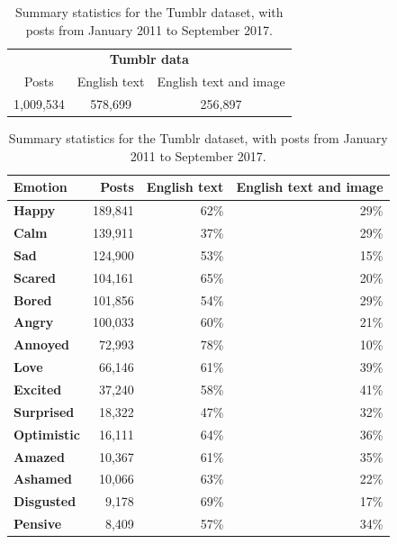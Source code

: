 \documentclass{article} %
\begin{document}
\begin{table}[H]
\caption{Summary statistics for the Tumblr dataset, with posts from January 2011 to September 2017.}
\begin{center}
    \begin{tabular}{ccc}
    \multicolumn{3}{c}{{\large \textbf{Tumblr data}}} \\
    \addlinespace[0.2cm]
    \toprule
    Posts & English text & English text and image \\
    \midrule
    1,009,534 & 578,699 & 256,897 \\
    \bottomrule
    \end{tabular}
	
    \vspace{0.2cm}
    
    \begin{tabular}{lrrr}
    \toprule
    Emotion & Posts & English text & English text and image\\
    \midrule
\textbf{Happy} & 189,841 & 62\% & 29\% \\
\textbf{Calm} & 139,911 & 37\% & 29\% \\
\textbf{Sad} & 124,900 & 53\% & 15\% \\
\textbf{Scared} & 104,161 & 65\% & 20\% \\
\textbf{Bored} & 101,856 & 54\% & 29\% \\
\textbf{Angry} & 100,033 & 60\% & 21\% \\
\textbf{Annoyed} & 72,993 & 78\% & 10\% \\
\textbf{Love} & 66,146 & 61\% & 39\% \\
\textbf{Excited} & 37,240 & 58\% & 41\% \\
\textbf{Surprised} & 18,322 & 47\% & 32\% \\
\textbf{Optimistic} & 16,111 & 64\% & 36\% \\
\textbf{Amazed} & 10,367 & 61\% & 35\% \\
\textbf{Ashamed} & 10,066 & 63\% & 22\% \\
\textbf{Disgusted} & 9,178 & 69\% & 17\% \\
\textbf{Pensive} & 8,409 & 57\% & 34\% \\
    \bottomrule
    \end{tabular}
    
    
\end{center}
\label{tumblrdata}
\end{table}
\end{document}
